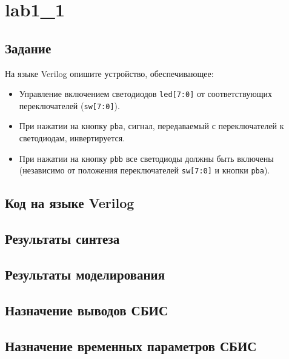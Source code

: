 





\tableofcontents
\listoffigures
\lstlistoflistings
\newpage

\section{lab1\_1}

\subsection{Задание}

На языке Verilog опишите устройство, обеспечивающее:
\begin{itemize}
	\setlength{\itemsep}{0em}
	\item Управление включением светодиодов \verb|led[7:0]| от соответствующих переключателей (\verb|sw[7:0]|).
	\item При нажатии на кнопку \verb|pba|, сигнал, передаваемый с переключателей к светодиодам, инвертируется.
	\item При нажатии на кнопку \verb|pbb| все светодиоды должны быть включены (независимо от положения переключателей \verb|sw[7:0]| и кнопки \verb|pba|).
\end{itemize}

\subsection{Код на языке Verilog}



\subsection{Результаты синтеза}

\subsection{Результаты моделирования}

\subsection{Назначение выводов СБИС}

\subsection{Назначение временных параметров СБИС}

